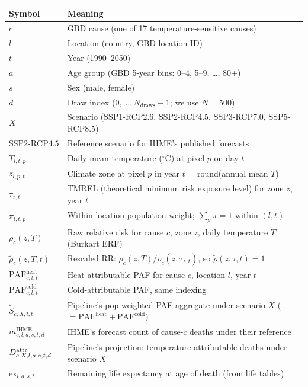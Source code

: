 \documentclass[11pt]{article}
\newcommand{\PAF}{\text{PAF}}
\newcommand{\SSPtwo}{\text{SSP2{-}RCP4.5}}
\newcommand{\mIHME}{m^{\text{IHME}}}
\begin{document}
\renewcommand{\arraystretch}{1.15}
\begin{center}
\begin{tabular}{l l}
\toprule
Symbol & Meaning \\
\midrule
$c$ & GBD cause (one of 17 temperature-sensitive causes) \\
$l$ & Location (country, GBD location ID) \\
$t$ & Year (1990--2050) \\
$a$ & Age group (GBD 5-year bins: 0--4, 5--9, \ldots, 80+) \\
$s$ & Sex (male, female) \\
$d$ & Draw index ($0, \ldots, N_{\text{draws}}-1$; we use $N=500$) \\
$X$ & Scenario (SSP1-RCP2.6, SSP2-RCP4.5, SSP3-RCP7.0, SSP5-RCP8.5) \\
$\SSPtwo$ & Reference scenario for IHME's published forecasts \\
\midrule
$T_{l,t,p}$ & Daily-mean temperature ($^{\circ}$C) at pixel $p$ on day $t$ \\
$z_{l,p,t}$ & Climate zone at pixel $p$ in year $t$ = round(annual mean $T$) \\
$\tau_{z,t}$ & TMREL (theoretical minimum risk exposure level) for zone
$z$, year $t$ \\
$\pi_{l,t,p}$ & Within-location population weight; $\sum_{p} \pi = 1$
within $(l, t)$ \\
\midrule
$\rho_c(z, T)$ & Raw relative risk for cause $c$, zone $z$, daily
temperature $T$ (Burkart ERF) \\
$\tilde\rho_c(z, T, t)$ & Rescaled RR: $\rho_c(z, T) /
\rho_c(z, \tau_{z,t})$, so $\tilde\rho(z, \tau, t) = 1$ \\
$\PAF^{\text{heat}}_{c,l,t}$ & Heat-attributable PAF for cause $c$,
location $l$, year $t$ \\
$\PAF^{\text{cold}}_{c,l,t}$ & Cold-attributable PAF, same indexing \\
$\tilde S_{c,X,l,t}$ & Pipeline's pop-weighted PAF aggregate under
scenario $X$ ($= \PAF^{\text{heat}} + \PAF^{\text{cold}}$) \\
\midrule
$\mIHME_{c,l,a,s,t,d}$ & IHME's forecast count of cause-$c$ deaths under
their reference \\
$\mAttr_{c,X,l,a,s,t,d}$ & Pipeline's projection: temperature-attributable
deaths under scenario $X$ \\
$\text{ex}_{l,a,s,t}$ & Remaining life expectancy at age of death (from
life tables) \\
\bottomrule
\end{tabular}
\end{center}
\end{document}
